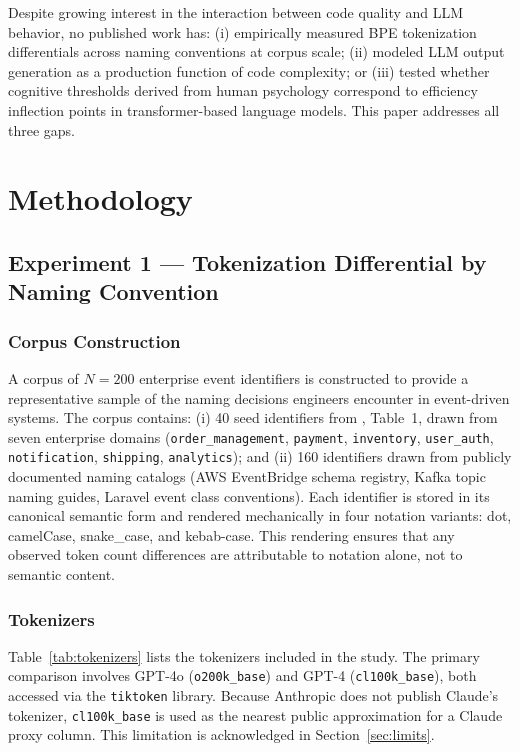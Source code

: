 \documentclass[11pt,a4paper]{article}
\begin{document}
Despite growing interest in the interaction between code quality and LLM
behavior, no published work has: (i) empirically measured BPE tokenization
differentials across naming conventions at corpus scale; (ii) modeled LLM
output generation as a production function of code complexity; or (iii)
tested whether cognitive thresholds derived from human psychology correspond
to efficiency inflection points in transformer-based language models. This
paper addresses all three gaps.

\section{Methodology}

\subsection{Experiment 1 --- Tokenization Differential by Naming Convention}
\label{sec:exp1}

\subsubsection{Corpus Construction}

A corpus of $N = 200$ enterprise event identifiers is constructed to provide
a representative sample of the naming decisions engineers encounter in
event-driven systems. The corpus contains: (i) 40 seed identifiers from
\citet{pereira2026a}, Table~1, drawn from seven enterprise domains
(\texttt{order\_management}, \texttt{payment}, \texttt{inventory},
\texttt{user\_auth}, \texttt{notification}, \texttt{shipping},
\texttt{analytics}); and (ii) 160 identifiers drawn from publicly documented
naming catalogs (AWS EventBridge schema registry, Kafka topic naming guides,
Laravel event class conventions). Each identifier is stored in its canonical
semantic form and rendered mechanically in four notation variants: dot,
camelCase, snake\_case, and kebab-case. This rendering ensures that any
observed token count differences are attributable to notation alone, not
to semantic content.

\subsubsection{Tokenizers}

Table~\ref{tab:tokenizers} lists the tokenizers included in the study.
The primary comparison involves GPT-4o (\texttt{o200k\_base}) and GPT-4
(\texttt{cl100k\_base}), both accessed via the \texttt{tiktoken} library.
Because Anthropic does not publish Claude's tokenizer, \texttt{cl100k\_base}
is used as the nearest public approximation for a Claude proxy column.
This limitation is acknowledged in Section~\ref{sec:limits}.
\end{document}
